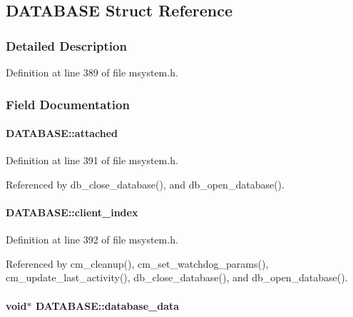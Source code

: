 \subsection{DATABASE Struct Reference}
\label{structDATABASE}


\subsubsection{Detailed Description}


Definition at line 389 of file msystem.h.

\subsubsection{Field Documentation}
\paragraph[{attached}]{ {\bf DATABASE::attached}}\hfill\label{structDATABASE_a9ab2678dd15ad15b4b18ea4e7d9f8245}


Definition at line 391 of file msystem.h.

Referenced by db\_\-close\_\-database(), and db\_\-open\_\-database().
\paragraph[{client\_\-index}]{ {\bf DATABASE::client\_\-index}}\hfill\label{structDATABASE_a562bab90ac5b1ed4e92282bfbd5ea7ed}


Definition at line 392 of file msystem.h.

Referenced by cm\_\-cleanup(), cm\_\-set\_\-watchdog\_\-params(), cm\_\-update\_\-last\_\-activity(), db\_\-close\_\-database(), and db\_\-open\_\-database().
\paragraph[{database\_\-data}]{\setlength{\rightskip}{0pt plus 5cm}void$\ast$ {\bf DATABASE::database\_\-data}}\hfill\label{structDATABASE_a1e8533d67cf644449502494edcd67b25}


